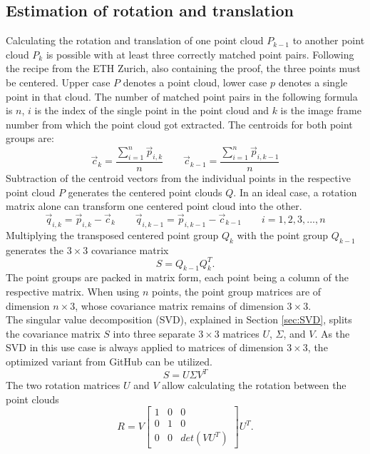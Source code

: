 \subsection{Estimation of rotation and translation}
\label{sec:ToFPosition_SVD}
Calculating the rotation and translation of one point cloud $P_{k-1}$ to another point cloud $P_{k}$ is possible with at least three correctly matched point pairs. Following the recipe from the ETH Zurich\cite{SVD_ETH}, also containing the proof, the three points must be centered.  Upper case $P$ denotes a point cloud, lower case $p$ denotes a single point in that cloud. The number of matched point pairs in the following formula is $n$, $i$ is the index of the single point in the point cloud and $k$ is the image frame number from which the point cloud got extracted.
The centroids for both point groups are:
\begin{equation*}
    \vec{c}_{k}=\frac{\sum_{i=1}^n \vec{p}_{i,k}}{n} \qquad 
    \vec{c}_{k-1}=\frac{\sum_{i=1}^n \vec{p}_{i,k-1}}{n} 
\end{equation*}
Subtraction of the centroid vectors from the individual points in the respective point cloud $P$ generates the centered point clouds $Q$. In an ideal case, a rotation matrix alone can transform one centered point cloud into the other. 
\begin{equation*}
    \vec{q}_{i,k}=\vec{p}_{i,k}-\vec{c}_{k} \qquad 
    \vec{q}_{i,k-1}=\vec{p}_{i,k-1}-\vec{c}_{k-1} \qquad i = 1, 2, 3, ... , n
\end{equation*}
Multiplying the transposed centered point group $Q_{k}$ with the point group $Q_{k-1}$ generates the $3\times3$ covariance matrix \begin{equation*}
    S= Q_{k-1}Q_{k}^{T}.
\end{equation*}
The point groups are packed in matrix form, each point being a column of the respective matrix. When using $n$ points, the point group matrices are of dimension $n\times3$, whose covariance matrix remains of dimension $3\times3$.\\
The singular value decomposition (SVD), explained in Section \ref{sec:SVD}, splits the covariance matrix $S$ into three separate $3\times3$ matrices $U$, $\Sigma$, and $V$. As the SVD in this use case is always applied to matrices of dimension $3\times3$, the optimized variant\cite{Gao:2018:GPU_MPM} from GitHub\cite{Github_SVD_CUDA} can be utilized.
\begin{equation*}
    S= U\Sigma V^{T}
\end{equation*}
The two rotation matrices $U$ and $V$ allow calculating the rotation between the point clouds\begin{equation*}
    R=V
    \begin{bmatrix}
        1 & 0 & 0 \\
        0 & 1 & 0 \\
        0 & 0 & det(VU^{T})
    \end{bmatrix}U^{T}.
\end{equation*}
